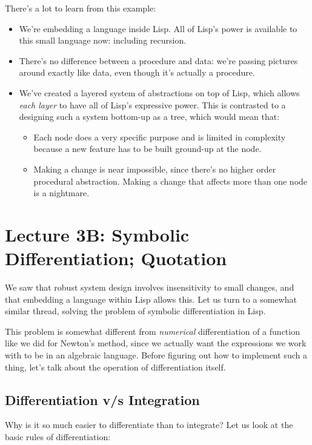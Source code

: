 \documentclass[9pt]{report}
\begin{document}
There's a lot to learn from this example:
\begin{itemize}
\item We're embedding a language inside Lisp. All of Lisp's power is
available to this small language now: including recursion.
\item There's no difference between a procedure and data: we're
passing pictures around exactly like data, even though it's
actually a procedure.
\item We've created a layered system of abstractions on top of Lisp,
which allows \emph{each layer} to have all of Lisp's expressive
power. This is contrasted to a designing such a system bottom-up
as a tree, which would mean that:
\begin{itemize}
\item Each node does a very specific purpose and is limited in
complexity because a new feature has to be built ground-up at
the node.
\item Making a change is near impossible, since there's no higher
order procedural abstraction. Making a change that affects
more than one node is a nightmare.
\end{itemize}
\end{itemize}

\chapter{Lecture 3B: Symbolic Differentiation; Quotation}
\label{sec:org4f153ae}

We saw that robust system design involves insensitivity to small
changes, and that embedding a language within Lisp allows this. Let
us turn to a somewhat similar thread, solving the problem of
symbolic differentiation in Lisp.

This problem is somewhat different from \emph{numerical} differentiation
of a function like we did for Newton's method, since we actually
want the expressions we work with to be in an algebraic language.
Before figuring out how to implement such a thing, let's talk about
the operation of differentiation itself.

\section{Differentiation v/s Integration}
\label{sec:org878af4b}

Why is it so much easier to differentiate than to integrate?
Let us look at the basic rules of differentiation:
\end{document}
